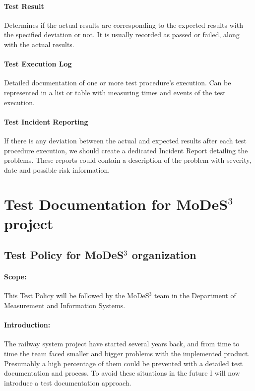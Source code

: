 \paragraph{Test Result}
Determines if the actual results are corresponding to the expected results with the specified deviation or not. It is usually recorded as passed or failed, along with the actual results.

\paragraph{Test Execution Log}
Detailed documentation of one or more test procedure's execution. Can be represented in a list or table with measuring times and events of the test execution.

\paragraph{Test Incident Reporting}
If there is any deviation between the actual and expected results after each test procedure execution, we should create a dedicated Incident Report detailing the problems. These reports could contain a description of the problem with severity, date and possible risk information.


\section{Test Documentation for MoDeS$^3$ project}\label{TestDoc:MODES}

\subsection{Test Policy for MoDeS$^3$ organization}
\paragraph{Scope:} This Test Policy will be followed by the MoDeS$^3$ team in the Department of Measurement and Information Systems.
\paragraph{Introduction:} The railway system project have started several years back, and from time to time the team faced smaller and bigger problems with the implemented product. Presumably a high percentage of them could be prevented with a detailed test documentation and process. To avoid these situations in the future I will now introduce a test documentation approach.
